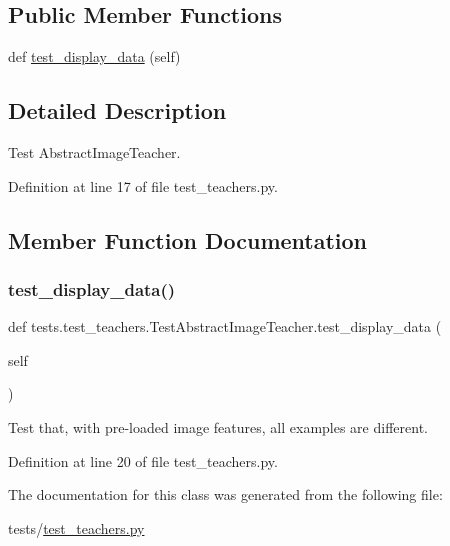 \subsection*{Public Member Functions}
\begin{DoxyCompactItemize}
\item 
def \hyperlink{classtests_1_1test__teachers_1_1TestAbstractImageTeacher_a7858e68d96209268ee2cfcf23030b7b7}{test\+\_\+display\+\_\+data} (self)
\end{DoxyCompactItemize}


\subsection{Detailed Description}
\begin{DoxyVerb}Test AbstractImageTeacher.\end{DoxyVerb}
 

Definition at line 17 of file test\+\_\+teachers.\+py.



\subsection{Member Function Documentation}
\mbox{\label{classtests_1_1test__teachers_1_1TestAbstractImageTeacher_a7858e68d96209268ee2cfcf23030b7b7}} 
\subsubsection{\texorpdfstring{test\+\_\+display\+\_\+data()}{test\_display\_data()}}
{\footnotesize\ttfamily def tests.\+test\+\_\+teachers.\+Test\+Abstract\+Image\+Teacher.\+test\+\_\+display\+\_\+data (\begin{DoxyParamCaption}\item[{}]{self }\end{DoxyParamCaption})}

\begin{DoxyVerb}Test that, with pre-loaded image features, all examples are different.\end{DoxyVerb}
 

Definition at line 20 of file test\+\_\+teachers.\+py.



The documentation for this class was generated from the following file\+:\begin{DoxyCompactItemize}
\item 
tests/\hyperlink{test__teachers_8py}{test\+\_\+teachers.\+py}\end{DoxyCompactItemize}
